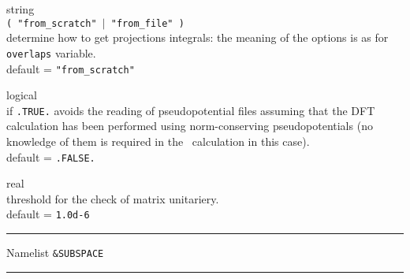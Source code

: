 {\noindent{}%
{\sc string} \\ {\tt ( "from\_scratch" $\mid$ "from\_file" ) }\\
determine how to get projections integrals:
the meaning of the options is as for {\tt overlaps} variable.\\ 
{\sc default} = {\tt "from\_scratch"} \par

\noindent{}%
{\sc logical} \\ if {\tt .TRUE.} avoids the reading of pseudopotential files
assuming that the DFT calculation has been performed using norm-conserving
pseudopotentials (no knowledge of them is required in the \WANT\ calculation 
in this case).\\ 
{\sc default} = {\tt .FALSE.} \par

\noindent{}%
{\sc real} \\ threshold for the check of matrix unitariery.\\ 
{\sc default} = {\tt 1.0d-6} \par
}\bigskip

\begin{centering}
\rule{2.2in}{0.01in} Namelist {\tt \&SUBSPACE} \rule{2.2in}{0.01in}
\end{centering}\\


